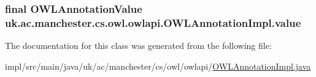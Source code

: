 \hypertarget{classuk_1_1ac_1_1manchester_1_1cs_1_1owl_1_1owlapi_1_1_o_w_l_annotation_impl_af4f4797d8db2e3b4b2112d798cf563ae}{
\subsubsection[{value}]{\setlength{\rightskip}{0pt plus 5cm}final {\bf O\-W\-L\-Annotation\-Value} uk.\-ac.\-manchester.\-cs.\-owl.\-owlapi.\-O\-W\-L\-Annotation\-Impl.\-value\hspace{0.3cm}{\ttfamily [private]}}}\label{classuk_1_1ac_1_1manchester_1_1cs_1_1owl_1_1owlapi_1_1_o_w_l_annotation_impl_af4f4797d8db2e3b4b2112d798cf563ae}


The documentation for this class was generated from the following file\-:\begin{DoxyCompactItemize}
\item 
impl/src/main/java/uk/ac/manchester/cs/owl/owlapi/\hyperlink{_o_w_l_annotation_impl_8java}{O\-W\-L\-Annotation\-Impl.\-java}\end{DoxyCompactItemize}
